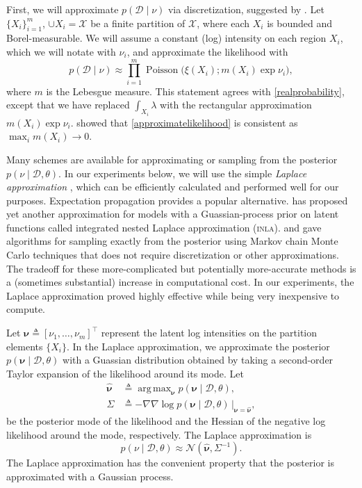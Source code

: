 \documentclass{article}
\newcommand{\deq}{\triangleq}
\newcommand{\cm}[1]{\mathcal{#1}}
\newcommand{\data}{\cm{D}}
\newcommand{\given}{\mid}
\DeclareMathOperator{\poisson}{Poisson}
\DeclareMathOperator*{\argmax}{arg\,max}
\begin{document}
First, we will approximate $p(\data \given \nu)$ via discretization,
suggested by \citet{moller}.  Let $\lbrace X_i \rbrace_{i=1}^m$, $\cup
X_i = \cm{X}$ be a finite partition of $\cm{X}$, where each $X_i$ is
bounded and Borel-measurable. We will assume a constant (log)
intensity on each region $X_i$, which we will notate with $\nu_i$, and
approximate the likelihood with
\begin{equation}
  \label{approximatelikelihood}
  p(\data \given \nu) 
  \approx
  \prod_{i=1}^m
  \poisson\bigl(\xi(X_i); m(X_i) \exp \nu_i\bigr),
\end{equation}
where $m$ is the Lebesgue measure.  This statement agrees with
\eqref{realprobability}, except that we have replaced $\int_{X_i}
\lambda$ with the rectangular approximation $m(X_i) \exp \nu_i$.
\citet{ghosh} showed that \eqref{approximatelikelihood} is consistent
as $\max_i m(X_i) \to 0$.

Many schemes are available for approximating or sampling from the
posterior $p(\nu \given \data, \theta)$.  In our experiments below, we
will use the simple \emph{Laplace approximation}
\citep{williamsbarber}, which can be efficiently calculated and
performed well for our purposes.  Expectation propagation
\citep{minka} provides a popular alternative.  \citet{inla} has
proposed yet another approximation for models with a Guassian-process
prior on latent functions called integrated nested Laplace
approximation (\textsc{inla}). \citet{adams} and \citet{ess} gave
algorithms for sampling exactly from the posterior using Markov chain
Monte Carlo techniques that does not require discretization or other
approximations.  The tradeoff for these more-complicated but
potentially more-accurate methods is a (sometimes substantial)
increase in computational cost.  In our experiments, the Laplace
approximation proved highly effective while being very inexpensive to
compute.

Let $\bm{\nu} \deq [\nu_1, \dotsc, \nu_m]^\top$ represent the latent
log intensities on the partition elements $\lbrace X_i \rbrace$.  In
the Laplace approximation, we approximate the posterior $p(\bm{\nu}
\given \data, \theta)$ with a Guassian distribution obtained by taking
a second-order Taylor expansion of the likelihood around its mode.
Let
\begin{align*}
  \hat{\bm{\nu}}
  &\deq 
  \argmax_{\bm{\nu}} p(\bm{\nu} \given \data, \theta), \\
  \Sigma 
  &\deq 
  -\nabla\nabla \log p(\bm{\nu} \given \data, \theta)
  \,
  \Bigr\rvert_{\bm{\nu} = \hat{\bm{\nu}}},
\end{align*}
be the posterior mode of the likelihood and the Hessian of the
negative log likelihood around the mode, respectively.  The Laplace
approximation is 
\begin{equation*}
  p(\nu \given \data, \theta) 
  \approx
  \cm{N}(\hat{\bm{\nu}}, \Sigma^{-1}).
\end{equation*}
The Laplace approximation has the convenient property that the
posterior is approximated with a Gaussian process.
\end{document}
